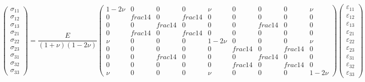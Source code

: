 \[
\begin{pmatrix}
	\sigma_{11}\\
	\sigma_{12}\\
	\sigma_{13}\\
	\sigma_{21}\\
	\sigma_{22}\\
	\sigma_{23}\\
	\sigma_{31}\\
	\sigma_{32}\\
	\sigma_{33}
\end{pmatrix}
=
\frac{E}{(1+\nu)(1-2\nu)}
\begin{pmatrix}
	1-2\nu &          0 &          0 &          0 &    \nu &          0 &          0 &          0 & \nu   \\
	     0 & frac{1}{4} &          0 & frac{1}{4} &      0 &          0 &          0 &          0 & 0     \\
	     0 &          0 & frac{1}{4} &          0 &      0 &          0 & frac{1}{4} &          0 & 0     \\
	     0 & frac{1}{4} &          0 & frac{1}{4} &      0 &          0 &          0 &          0 & 0     \\
	   \nu &          0 &          0 &          0 & 1-2\nu &          0 &          0 &          0 & \nu   \\
  	     0 &          0 &          0 &          0 &      0 & frac{1}{4} &          0 & frac{1}{4} & 0     \\
	     0 &          0 & frac{1}{4} &          0 &      0 &          0 & frac{1}{4} &          0 & 0     \\
	     0 &          0 &          0 &          0 &      0 & frac{1}{4} &          0 & frac{1}{4} & 0     \\
	   \nu &          0 &          0 &          0 &    \nu &          0 &          0 &          0 & 1-2\nu
\end{pmatrix}
\begin{pmatrix}
	\varepsilon_{11} \\
	\varepsilon_{12} \\
	\varepsilon_{13} \\
	\varepsilon_{21} \\
	\varepsilon_{22} \\
	\varepsilon_{23} \\
	\varepsilon_{31} \\
	\varepsilon_{32} \\
	\varepsilon_{33}
\end{pmatrix}
\]

